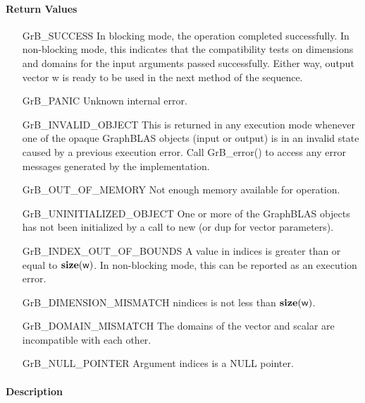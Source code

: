 \paragraph{Return Values}

\begin{itemize}[leftmargin=2.1in]
    \item[{\sf GrB\_SUCCESS}]         In blocking mode, the operation completed
    successfully. In non-blocking mode, this indicates that the compatibility 
    tests on dimensions and domains for the input arguments passed successfully. 
    Either way, output vector {\sf w} is ready to be used in the next method of 
    the sequence.

    \item[{\sf GrB\_PANIC}]            Unknown internal error.
    
    \item[{\sf GrB\_INVALID\_OBJECT}] This is returned in any execution mode 
    whenever one of the opaque GraphBLAS objects (input or output) is in an invalid 
    state caused by a previous execution error.  Call {\sf GrB\_error()} to access 
    any error messages generated by the implementation.

    \item[{\sf GrB\_OUT\_OF\_MEMORY}]  Not enough memory available for operation.
    
    \item[{\sf GrB\_UNINITIALIZED\_OBJECT}] One or more of the GraphBLAS objects
    has not been initialized by a call to {\sf new} (or {\sf dup} for vector
    parameters).

    \item[{\sf GrB\_INDEX\_OUT\_OF\_BOUNDS}]  A value in {\sf indices} is greater
    than or equal to $\bold{size}({\sf w})$.  In non-blocking mode, this can be
    reported as an execution error.
    
    \item[{\sf GrB\_DIMENSION\_MISMATCH}] {\sf nindices} is not less than $\bold{size}({\sf w})$. 

    \item[{\sf GrB\_DOMAIN\_MISMATCH}]    The domains of the vector and scalar are
	incompatible with each other.

    \item[{\sf GrB\_NULL\_POINTER}] Argument {\sf indices} is a {\sf NULL} pointer.
\end{itemize}


\paragraph{Description}

